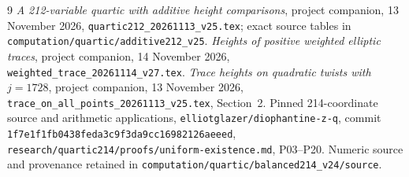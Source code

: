 \documentclass[11pt,a4paper]{article}
\begin{document}
\begin{thebibliography}{9}\small
{} \emph{A 212-variable quartic with additive height comparisons},
project companion, 13 November 2026,
\nolinkurl{quartic212_20261113_v25.tex}; exact source tables in
\nolinkurl{computation/quartic/additive212_v25}.
 \emph{Heights of positive weighted elliptic traces},
project companion, 14 November 2026,
\nolinkurl{weighted_trace_20261114_v27.tex}.
 \emph{Trace heights on quadratic twists with $j=1728$},
project companion, 13 November 2026,
\nolinkurl{trace_on_all_points_20261113_v25.tex}, Section~2.
 Pinned 214-coordinate source and arithmetic applications,
\texttt{elliotglazer/diophantine-z-q}, commit
\texttt{1f7e1f1fb0438feda3c9f3da9cc16982126aeeed},
\nolinkurl{research/quartic214/proofs/uniform-existence.md}, P03--P20.
Numeric source and provenance retained in
\nolinkurl{computation/quartic/balanced214_v24/source}.
\end{thebibliography}
\end{document}
